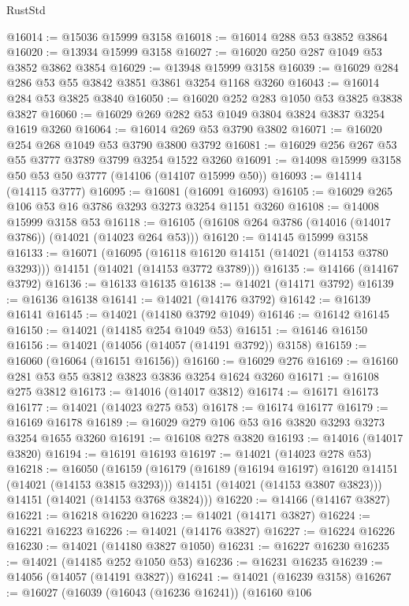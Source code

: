 \begin{lexlean}{RustStd}
\begin{coremodule}
{\begin{coremodule}
{{{{{{{{{{{{{{{{{{{{{{{{{{{{{{{{{{{{{{{@16014 := @15036 @15999 @3158
@16018 := @16014 @288 @53 @3852 @3864
@16020 := @13934 @15999 @3158
@16027 := @16020 @250 @287 @1049 @53 @3852 @3862 @3854
@16029 := @13948 @15999 @3158
@16039 := @16029 @284 @286 @53 @55 @3842 @3851 @3861 @3254 @1168 @3260
@16043 := @16014 @284 @53 @3825 @3840
@16050 := @16020 @252 @283 @1050 @53 @3825 @3838 @3827
@16060 := @16029 @269 @282 @53 @1049 @3804 @3824 @3837 @3254 @1619 @3260
@16064 := @16014 @269 @53 @3790 @3802
@16071 := @16020 @254 @268 @1049 @53 @3790 @3800 @3792
@16081 := @16029 @256 @267 @53 @55 @3777 @3789 @3799 @3254 @1522 @3260
@16091 := @14098 @15999 @3158 @50 @53 @50 @3777 (@14106 (@14107 @15999 @50))
@16093 := @14114 (@14115 @3777)
@16095 := @16081 (@16091 @16093)
@16105 := @16029 @265 @106 @53 @16 @3786 @3293 @3273 @3254 @1151 @3260
@16108 := @14008 @15999 @3158 @53
@16118 := @16105 (@16108 @264 @3786 (@14016 (@14017 @3786)) (@14021 (@14023 @264 @53)))
@16120 := @14145 @15999 @3158
@16133 := @16071
    (@16095
      (@16118 @16120 @14151 (@14021 (@14153 @3780 @3293)))
      @14151
      (@14021 (@14153 @3772 @3789)))
@16135 := @14166 (@14167 @3792)
@16136 := @16133 @16135
@16138 := @14021 (@14171 @3792)
@16139 := @16136 @16138
@16141 := @14021 (@14176 @3792)
@16142 := @16139 @16141
@16145 := @14021 (@14180 @3792 @1049)
@16146 := @16142 @16145
@16150 := @14021 (@14185 @254 @1049 @53)
@16151 := @16146 @16150
@16156 := @14021 (@14056 (@14057 (@14191 @3792)) @3158)
@16159 := @16060 (@16064 (@16151 @16156))
@16160 := @16029 @276
@16169 := @16160 @281 @53 @55 @3812 @3823 @3836 @3254 @1624 @3260
@16171 := @16108 @275 @3812
@16173 := @14016 (@14017 @3812)
@16174 := @16171 @16173
@16177 := @14021 (@14023 @275 @53)
@16178 := @16174 @16177
@16179 := @16169 @16178
@16189 := @16029 @279 @106 @53 @16 @3820 @3293 @3273 @3254 @1655 @3260
@16191 := @16108 @278 @3820
@16193 := @14016 (@14017 @3820)
@16194 := @16191 @16193
@16197 := @14021 (@14023 @278 @53)
@16218 := @16050
    (@16159
      (@16179
        (@16189 (@16194 @16197) @16120 @14151 (@14021 (@14153 @3815 @3293)))
        @14151
        (@14021 (@14153 @3807 @3823)))
      @14151
      (@14021 (@14153 @3768 @3824)))
@16220 := @14166 (@14167 @3827)
@16221 := @16218 @16220
@16223 := @14021 (@14171 @3827)
@16224 := @16221 @16223
@16226 := @14021 (@14176 @3827)
@16227 := @16224 @16226
@16230 := @14021 (@14180 @3827 @1050)
@16231 := @16227 @16230
@16235 := @14021 (@14185 @252 @1050 @53)
@16236 := @16231 @16235
@16239 := @14056 (@14057 (@14191 @3827))
@16241 := @14021 (@16239 @3158)
@16267 := @16027
    (@16039
      (@16043 (@16236 @16241))
      (@16160
        @106
}}}}}}}}}}}}}}}}}}}}}}}}}}}}}}}}}}}}}}}
\end{coremodule}}
\end{coremodule}
\end{lexlean}
